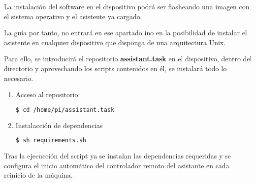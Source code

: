 La instalación del software en el dispositivo podrá ser flasheando una imagen con el sistema operativo y el asistente ya cargado.

La guía por tanto, no entrará en ese apartado ino en la posibilidad de instalar el asistente en cualquier dispositivo que disponga de una arquitectura Unix.

Para ello, se introducirá el repositorio \textbf{assistant.task} en el dispositivo, dentro del directorio \text y aprovechando los scripts contenidos en él, se instalará todo lo necesario.

\begin{enumerate}
    \item Acceso al repositorio:
    
        \begin{lstlisting}[language=bash]
            $ cd /home/pi/assistant.task
        \end{lstlisting}
    
    \item Instalacción de dependencias
    
        \begin{lstlisting}[language=bash]
            $ sh requirements.sh
        \end{lstlisting}
    
\end{enumerate}

Tras la ejecucción del script ya se instalan las dependencias requeridas y se configura el inicio automático del controlador remoto del asistante en cada reinicio de la máquina.
